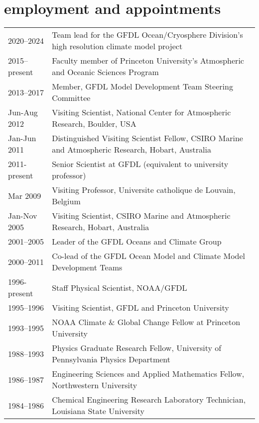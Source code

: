 \documentclass{article}
\begin{document}
\section*{\sc \color{Maroon}   employment and appointments} 
\vspace{-.25cm}
\begin{tabular}{ll}

2020--2024 & Team lead for the GFDL Ocean/Cryosphere Division's high resolution climate model project
  \\
  2015--present & Faculty member of Princeton University's Atmospheric and Oceanic Sciences Program
  \\
  2013--2017  & Member, GFDL Model Development Team Steering Committee  \\
  Jun-Aug 2012  & Visiting Scientist, National Center for Atmospheric
                  Research, Boulder, USA \\
  Jan-Jun 2011   & Distinguished Visiting Scientist Fellow, CSIRO Marine and Atmospheric Research, Hobart, Australia \\
  2011-present & Senior Scientist at GFDL (equivalent to university professor) \\ 
  Mar 2009         & Visiting Professor, Universite catholique de Louvain, Belgium \\
  Jan-Nov 2005   & Visiting Scientist, CSIRO Marine and Atmospheric  Research, Hobart, Australia \\
  2001--2005     & Leader of the GFDL Oceans and Climate Group \\
  2000--2011     & Co-lead of the GFDL Ocean Model and Climate Model Development Teams \\
  1996-present   &  Staff Physical Scientist, NOAA/GFDL \\  
  1995--1996     &  Visiting Scientist, GFDL and Princeton University  \\ 
  1993--1995     & NOAA Climate \& Global Change Fellow at Princeton University \\
  1988--1993     &  Physics Graduate Research Fellow, University of Pennsylvania Physics Department  \\                     
  1986--1987     &  Engineering Sciences and Applied Mathematics Fellow, Northwestern University \\
  1984--1986     &  Chemical Engineering Research Laboratory Technician, Louisiana State University
\end{tabular}


\vspace{-.5cm}
\end{document}
